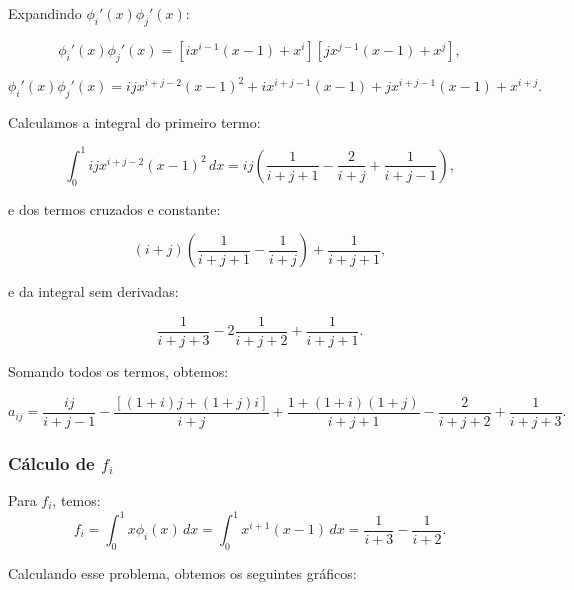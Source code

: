 \documentclass{article}
\begin{document}
Expandindo \( \phi_i'(x) \phi_j'(x) \):

\[
\phi_i'(x) \phi_j'(x) = [ix^{i-1}(x-1) + x^i][jx^{j-1}(x-1) + x^j],
\]

\[
\phi_i'(x) \phi_j'(x) = ijx^{i+j-2}(x-1)^2 + i x^{i+j-1}(x-1) + j x^{i+j-1}(x-1) + x^{i+j}.
\]

Calculamos a integral do primeiro termo:

\[
\int_0^1 ij x^{i+j-2} (x-1)^2 \, dx = ij \left( \frac{1}{i+j+1} - \frac{2}{i+j} + \frac{1}{i+j-1} \right),
\]

e dos termos cruzados e constante:

\[
(i+j) \left( \frac{1}{i+j+1} - \frac{1}{i+j} \right) + \frac{1}{i+j+1},
\]

e da integral sem derivadas:

\[
\frac{1}{i+j+3} - 2 \frac{1}{i+j+2} + \frac{1}{i+j+1}.
\]

Somando todos os termos, obtemos:

\[
a_{ij} = \frac{ij}{i+j-1} - \frac{[(1+i)j + (1+j)i]}{i+j} + \frac{1 + (1+i)(1+j)}{i+j+1} - \frac{2}{i+j+2} + \frac{1}{i+j+3}.
\]

\subsubsection{Cálculo de \( f_i \)}
Para \( f_i \), temos:
\[
f_i = \int_0^1 x \phi_i(x) \, dx = \int_0^1 x^{i+1}(x-1) \, dx = \frac{1}{i+3} - \frac{1}{i+2}.
\]

Calculando esse problema, obtemos os seguintes gráficos:
\end{document}
